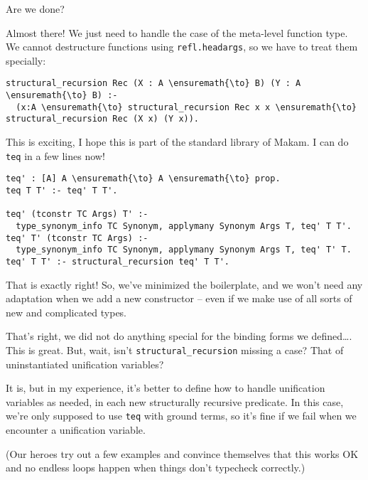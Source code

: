 \heroSTUDENT{} Are we done?

\heroADVISOR{} Almost there! We just need to handle the case of the meta-level
function type. We cannot destructure functions using
\texttt{refl.headargs}, so we have to treat them specially:

\begin{verbatim}
structural_recursion Rec (X : A \ensuremath{\to} B) (Y : A \ensuremath{\to} B) :-
  (x:A \ensuremath{\to} structural_recursion Rec x x \ensuremath{\to} structural_recursion Rec (X x) (Y x)).
\end{verbatim}

\heroSTUDENT{} This is exciting, I hope this is part of the standard library
of Makam. I can do \texttt{teq} in a few lines now!

\begin{verbatim}
teq' : [A] A \ensuremath{\to} A \ensuremath{\to} prop.
teq T T' :- teq' T T'.

teq' (tconstr TC Args) T' :-
  type_synonym_info TC Synonym, applymany Synonym Args T, teq' T T'.
teq' T' (tconstr TC Args) :-
  type_synonym_info TC Synonym, applymany Synonym Args T, teq' T' T.
teq' T T' :- structural_recursion teq' T T'.
\end{verbatim}

\heroADVISOR{} That is exactly right! So, we've minimized the boilerplate, and
we won't need any adaptation when we add a new constructor -- even if we
make use of all sorts of new and complicated types.

\heroSTUDENT{} That's right, we did not do anything special for the binding
forms we defined\ldots{}. This is great. But, wait, isn't
\texttt{structural\_recursion} missing a case? That of uninstantiated
unification variables?

\heroADVISOR{} It is, but in my experience, it's better to define how to
handle unification variables as needed, in each new structurally
recursive predicate. In this case, we're only supposed to use
\texttt{teq} with ground terms, so it's fine if we fail when we
encounter a unification variable.

\begin{scenecomment}
(Our heroes try out a few examples and convince themselves that this works OK and no endless loops happen when things don't typecheck correctly.)
\end{scenecomment}
